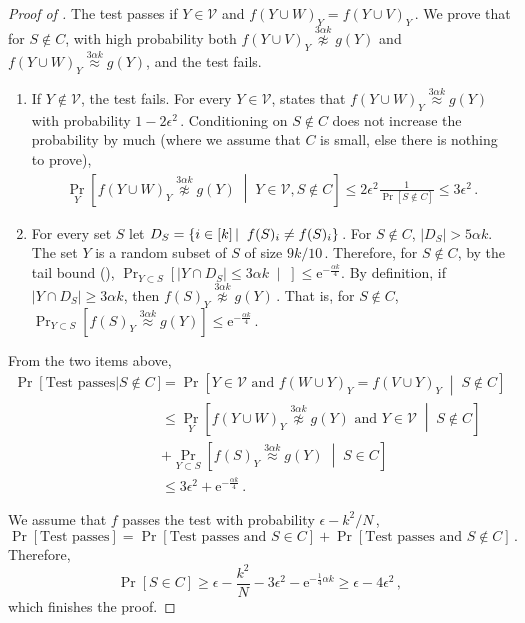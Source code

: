 \documentclass[11pt]{article}
\numberwithin{equation}{section}
\theoremstyle{definition}
\theoremstyle{plain}
\newcommand{\eee}{\mathrm e}
\newcommand{\Prob}[2][]{\Pr_{{#1}}\left[#2\right]} %
\newcommand{\abs}[1]{\lvert#1\rvert} %
\newcommand{\given}{\;\middle\vert\;} %
\newcommand\sett[2]{\left\{ #1 \left| \; \vphantom{#1 #2} \right. #2  \right\}} %
\newcommand\f{f} %
\newcommand\setf{f} %
\newcommand{\g}{g} %
\newcommand\neql[1]{\stackrel{{#1}}{ \approx}} %
\newcommand\neqg[1]{\stackrel{{#1}}{ \not\approx}} %
\newcommand\cons{\mathcal{V}} %
\begin{document}
\begin{proof}[Proof of ]
	The test passes if $Y\in\cons$ and $\setf(Y\cup W)_Y= \setf(Y\cup V)_Y$\,. We prove that for $S\notin C$, with high probability both $\setf(Y\cup V)_Y \neqg{3\alpha k} \g(Y)$ and $\setf(Y\cup W)_Y\neql{3\alpha k} \g(Y)$, and the test fails.

    \begin{enumerate}
        \item \label{item:sets local}   
        If $Y\notin \cons$, the test fails. For every $Y\in\cons$,  states that $\setf(Y\cup W)_Y\neql{3\alpha k} \g(Y)$ with probability $1-2\epsilon^2$\,. Conditioning on $S\notin C$ does not increase the probability by much (where we assume that $C$ is small, else there is nothing to prove),
	\begin{align}\label{eq:set func eq product}
		\Prob[Y]{\setf(Y\cup W)_Y\neqg{3\alpha k} \g(Y)\given Y\in \cons,S\notin C}\leq 2\epsilon^2\frac{1}{\Pr[S\notin C]} \leq 3\epsilon^2\,. %
	\end{align}
      \item 	For every set $S$ let $D_S = \sett{i\in[k]}{\f(S)_i\neq \setf(S)_i}$\,. For $S\notin C$, $\abs{D_S} > 5\alpha k$. The set $Y$ is a random subset of $S$ of size $9k/10$\,. Therefore, for $S\notin C$, by
%
the  %
%
tail bound (), $\Prob[Y\subset S]{\abs{Y\cap D_S}\leq {3\alpha k} \given}\leq   \eee^{-\frac{\alpha k}{4}}.$ By definition, if $\abs{Y\cap D_S}\geq {3\alpha k}$, then $\setf(S)_Y \neqg{3\alpha k} \g(Y)$\,. That is, for $S\notin C$, $\Prob[Y\subset S]{\setf(S)_Y \neql{3\alpha k} \g(Y)} \leq \eee^{-\frac{\alpha k}{4}}$\,.
    \end{enumerate}
 
	
    From the two items above, 
	\begin{align*}
	    \Pr[\text{Test passes}| S\notin C]
	    &= \Prob{Y\in\cons \textrm{ and } \f(W\cup Y)_Y = \f(V\cup Y)_Y \given S\notin C}\\
	    &\leq \Prob[Y]{\setf(Y\cup W)_Y\neqg{3\alpha k} \g(Y) \textrm{ and } Y\in \cons \given S\notin C} \\
	    &+ \Prob[Y\subset S]{\setf(S)_Y \neql{3\alpha k} \g(Y) \given S\in C} 
	    \\ &\leq 3\epsilon^2 + \eee^{-\frac{\alpha k}{4}}\,.
	\end{align*}
	
	We assume that $\f$ passes the test with probability $\epsilon -
	k^2/N$\,, %
	\[ \Pr[\text{Test passes}] = \Pr[\text{Test passes and } S\in C] + \Pr[\text{Test passes and } S\notin C]\,. \]%
	Therefore,
	\[ \Pr[S\in C]\geq \epsilon -\frac{k^2}{N} - 3\epsilon^2 - \eee^{-\frac{1}{4}\alpha k} \geq \epsilon - 4\epsilon^2\,, \] %
	which finishes the proof.
\end{proof}
\end{document}
